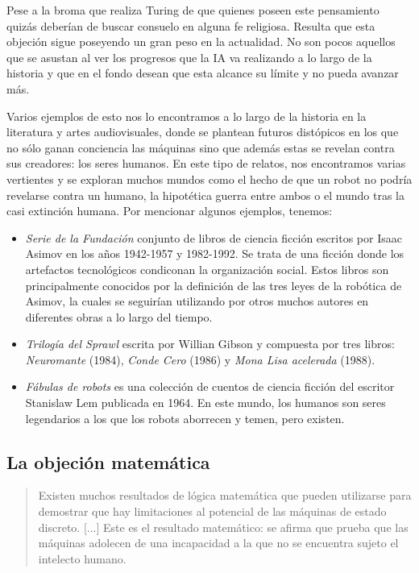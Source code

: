 \documentclass[12pt,a4paper]{article}
\begin{document}
Pese a la broma que realiza Turing de que quienes poseen este pensamiento quizás deberían de buscar consuelo en alguna fe religiosa. Resulta que esta objeción sigue poseyendo un gran peso en la actualidad. No son pocos aquellos que se asustan al ver los progresos que la IA va realizando a lo largo de la historia y que en el fondo desean que esta alcance su límite y no pueda avanzar más.

Varios ejemplos de esto nos lo encontramos a lo largo de la historia en la literatura y artes audiovisuales, donde se plantean futuros distópicos en los que no sólo ganan conciencia las máquinas sino que además estas se revelan contra sus creadores: los seres humanos. En este tipo de relatos, nos encontramos varias vertientes y se exploran muchos mundos como el hecho de que un robot no podría revelarse contra un humano, la hipotética guerra entre ambos o el mundo tras la casi extinción humana. Por mencionar algunos ejemplos, tenemos:

\begin{itemize}
\item \emph{Serie de la Fundación}\cite{Asimov} conjunto de libros de ciencia ficción escritos por Isaac Asimov en los años 1942-1957 y 1982-1992. Se trata de una ficción donde los artefactos tecnológicos condiconan la organización social. Estos libros son principalmente conocidos por la definición de las tres leyes de la robótica de Asimov, la cuales se seguirían utilizando por otros muchos autores en diferentes obras a lo largo del tiempo.
\item \emph{Trilogía del Sprawl}\cite{Sprawl} escrita por Willian Gibson y compuesta por tres libros: \emph{Neuromante} (1984),\emph{ Conde Cero} (1986) y \emph{Mona Lisa acelerada} (1988).
\item \emph{Fábulas de robots}\cite{Robots} es una colección de cuentos de ciencia ficción del escritor Stanislaw Lem publicada en 1964. En este mundo, los humanos son seres legendarios a los que los robots aborrecen y temen, pero existen.
\end{itemize}

\subsection{La objeción matemática}
\begin{quote}\small Existen muchos resultados de lógica matemática que pueden utilizarse para demostrar que hay limitaciones al potencial de las máquinas de estado discreto. [...] Este es el resultado matemático: se afirma que prueba que las máquinas adolecen de una incapacidad a la que no se encuentra sujeto el intelecto humano.\end{quote}
\end{document}
